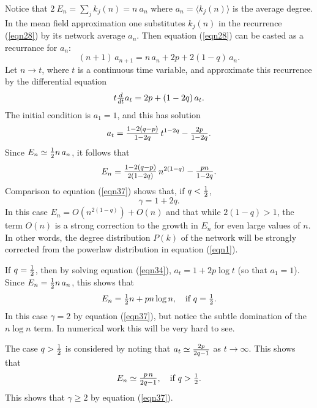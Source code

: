 \documentclass[12pt]{iopart}
\def\sfrac#1#2{\hbox{\normalsize $\frac{#1}{#2}$}}
\def\Sfrac#1#2{\hbox{\large$\frac{#1}{#2}$}}
\def\Ref#1{(\ref{#1})}
\def\thin{\:\!}
\begin{document}
Notice that $2\thin E_n = \sum_j k_j(n) = n\thin a_n$ where $a_n = \langle k_j(n) \rangle$ is
the average degree.  In the mean field approximation one substitutes $ k_j(n)$ in 
the recurrence \Ref{eqn28} by its network average $a_n$.  Then equation \Ref{eqn28}
can be casted as a recurrance for $a_n$:
\begin{equation}
(n+1)\,a_{n+1} = n\, a_n + 2p + 2(1-q)\, a_n .
\end{equation}
Let $n\to t$, where $t$ is a continuous time variable, and approximate this 
recurrence by the differential equation
\begin{equation}
t \sfrac{d}{dt} a_t = 2p + (1-2q)\, a_t .
\label{eqn34}   %
\end{equation}
The initial condition is $a_1=1$, and this has solution
\begin{equation}
a_t = \Sfrac{1-2(q-p)}{1-2q} \, t^{1-2q} -\Sfrac{2p}{1-2q} .
\label{eqn35}   %
\end{equation}
Since $E_n \simeq \sfrac{1}{2} n\, a_n$, it follows that
\begin{equation}
E_n %
= \Sfrac{1-2(q-p)}{2(1-2q)}\, n^{2(1-q)} - \Sfrac{pn}{1-2q} .
\label{eqn36}   %
\end{equation}
Comparison to equation \Ref{eqn37} shows that, if $q<\sfrac{1}{2}$, 
\begin{equation}
\gamma = 1+2q .
\end{equation}
In this case $E_n = O(n^{2(1-q)}) + O(n)$ and that while $2(1-q)>1$, the term $O(n)$ is a 
strong correction to the growth in $E_n$ for even large values of $n$.  In
other words, the degree distribution $P(k)$ of the network will be strongly
corrected from the powerlaw distribution in equation \Ref{eqn1}.

If $q=\sfrac{1}{2}$, then by solving equation \Ref{eqn34}, $a_t = 1 + 2p\log t$ 
(so that $a_1 = 1$).  Since $E_n = \sfrac{1}{2} n \, a_n$, this shows that
\begin{equation}
E_n = \sfrac{1}{2}n + pn \log n, \quad\hbox{if $q=\sfrac{1}{2}$.}
\end{equation}
In this case $\gamma=2$ by equation \Ref{eqn37}, but notice the
subtle domination of the $n\log n$ term.  In numerical work this
will be very hard to see.

The case $q>\sfrac{1}{2}$ is considered by noting that $a_t \simeq \sfrac{2p}{2q-1}$ as
$t\to\infty$.  This shows that
\begin{equation}
E_n \simeq \Sfrac{p\,n}{2q-1}, \quad\hbox{if $q>\sfrac{1}{2}$.}
\label{eqn43}   %
\end{equation}
This shows that $\gamma\geq 2$ by equation \Ref{eqn37}.  
\end{document}
